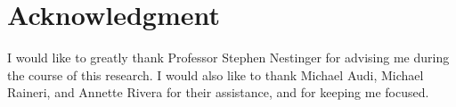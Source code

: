 \documentclass{report}
\begin{document}




\tableofcontents
\listoffigures








\chapter*{Acknowledgment}
I would like to greatly thank Professor Stephen Nestinger for advising me during the course of this research. I would also like to thank Michael Audi, Michael Raineri, and Annette Rivera for their assistance, and for keeping me focused.




\appendix



\end{document}
